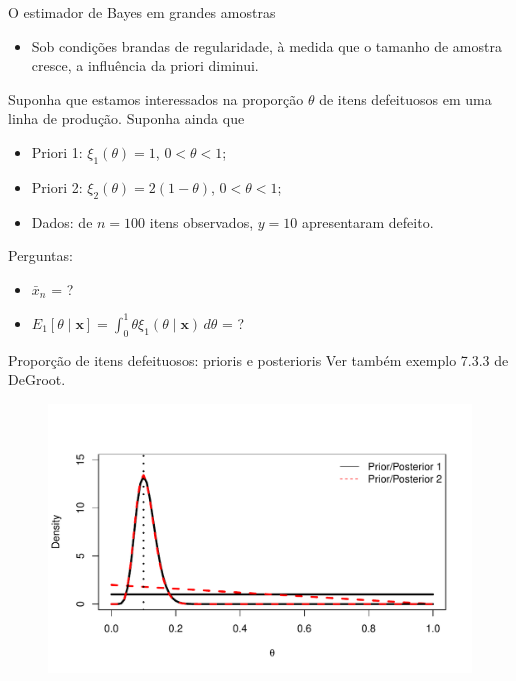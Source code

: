 \begin{frame}{O estimador de Bayes em grandes amostras}
\begin{itemize}
 \item Sob condições brandas de regularidade, à medida que o tamanho de amostra cresce, a influência da priori diminui.
\end{itemize}

\begin{exemplo}
\label{ex:proportion_defective_items}
Suponha que estamos interessados na proporção $\theta$ de itens defeituosos em uma linha de produção.
Suponha ainda que
\begin{itemize}
 \item Priori 1: $\xi_1(\theta) = 1$, $0 < \theta < 1$;
 \item Priori 2: $\xi_2(\theta) = 2(1-\theta)$, $0 < \theta < 1$;
 \item Dados: de $n = 100$ itens observados, $y = 10$ apresentaram defeito.
\end{itemize}

Perguntas:
\begin{itemize}
 \item $\bar{x}_n$ = ?
 \item $E_1[\theta \mid \boldsymbol{x}] = \int_{0}^1 \theta \xi_1(\theta \mid \boldsymbol{x})\,d\theta$ = ?
\end{itemize} 
\end{exemplo}
\end{frame}

\begin{frame}{Proporção de itens defeituosos: prioris e posterioris}
Ver também exemplo 7.3.3 de DeGroot.
\begin{figure}[!ht]
\label{fig:defect_items}
\begin{center}
\includegraphics[scale=0.65]{figures/defeituosos.pdf} 
\end{center} 
\end{figure} 
\end{frame}


